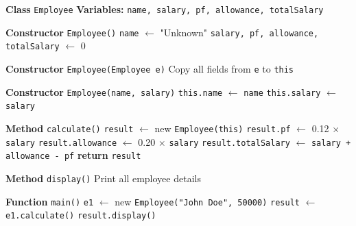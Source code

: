 \begin{algorithm}[H]
\caption{Employee Salary Calculation with Copy Constructor}
\begin{algorithmic}[1]

\STATE \textbf{Class} \texttt{Employee}
\STATE \hspace{1em} \textbf{Variables:} \texttt{name, salary, pf, allowance, totalSalary}

\STATE \hspace{1em} \textbf{Constructor} \texttt{Employee()}
\STATE \hspace{2em} \texttt{name} $\gets$ "Unknown"
\STATE \hspace{2em} \texttt{salary, pf, allowance, totalSalary} $\gets$ 0

\STATE \hspace{1em} \textbf{Constructor} \texttt{Employee(Employee e)}
\STATE \hspace{2em} Copy all fields from \texttt{e} to \texttt{this}

\STATE \hspace{1em} \textbf{Constructor} \texttt{Employee(name, salary)}
\STATE \hspace{2em} \texttt{this.name} $\gets$ \texttt{name}
\STATE \hspace{2em} \texttt{this.salary} $\gets$ \texttt{salary}

\STATE \hspace{1em} \textbf{Method} \texttt{calculate()}
\STATE \hspace{2em} \texttt{result} $\gets$ new \texttt{Employee(this)}
\STATE \hspace{2em} \texttt{result.pf} $\gets$ 0.12 $\times$ \texttt{salary}
\STATE \hspace{2em} \texttt{result.allowance} $\gets$ 0.20 $\times$ \texttt{salary}
\STATE \hspace{2em} \texttt{result.totalSalary} $\gets$ \texttt{salary + allowance - pf}
\STATE \hspace{2em} \textbf{return} \texttt{result}

\STATE \hspace{1em} \textbf{Method} \texttt{display()}
\STATE \hspace{2em} Print all employee details

\STATE

\STATE \textbf{Function} \texttt{main()}
\STATE \hspace{1em} \texttt{e1} $\gets$ new \texttt{Employee("John Doe", 50000)}
\STATE \hspace{1em} \texttt{result} $\gets$ \texttt{e1.calculate()}
\STATE \hspace{1em} \texttt{result.display()}

\end{algorithmic}
\end{algorithm}